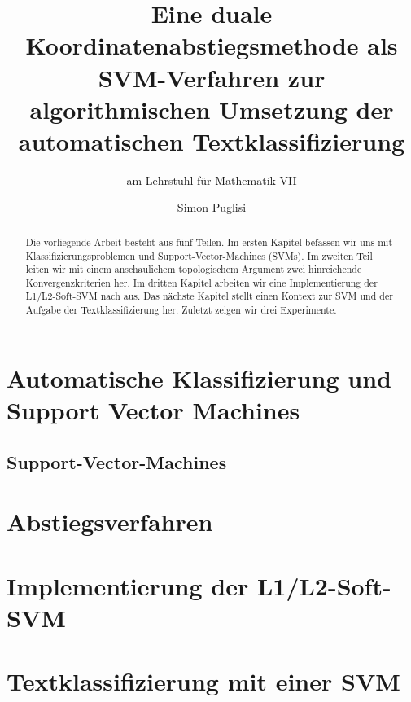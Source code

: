 \documentclass[bachelor,german]{mathe1thesis}
\title{Eine duale Koordinatenabstiegsmethode als SVM-Verfahren zur algorithmischen Umsetzung der automatischen Textklassifizierung} %
\subtitle{am Lehrstuhl für Mathematik VII}
\author{Simon Puglisi} %
\begin{document}

\begin{abstract}
    Die vorliegende Arbeit besteht aus fünf Teilen. Im ersten Kapitel befassen wir uns mit Klassifizierungsproblemen und Support-Vector-Machines (SVMs). Im zweiten Teil leiten wir mit einem anschaulichem topologischem Argument zwei hinreichende Konvergenzkriterien her. Im dritten Kapitel arbeiten wir eine Implementierung der L1/L2-Soft-SVM nach \cite{hcl-ddms-08} aus. Das nächste Kapitel stellt einen Kontext zur SVM und der Aufgabe der Textklassifizierung her. Zuletzt zeigen wir drei Experimente.

\end{abstract}

\thesistableofcontents











\chapter{Automatische Klassifizierung und Support Vector Machines}

 
\section{Support-Vector-Machines}


\chapter{Abstiegsverfahren}


\chapter{Implementierung der L1/L2-Soft-SVM}


\chapter{Textklassifizierung mit einer SVM}

\end{document}
